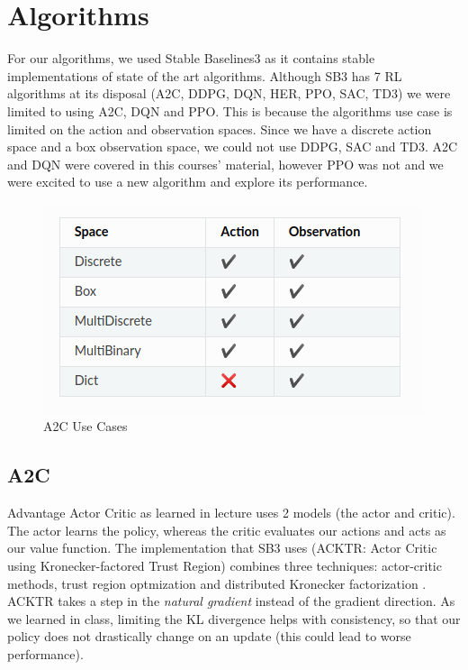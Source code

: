 \documentclass[twoside,11pt]{article}
\begin{document}
\section{Algorithms}
For our algorithms, we used Stable Baselines3 as it contains stable implementations of state of the art algorithms. Although SB3 has 7 RL algorithms at its disposal (A2C, DDPG, DQN, HER, PPO, SAC, TD3) we were limited to using A2C, DQN and PPO. This is because the algorithms use case is limited on the action and observation spaces. Since we have a discrete action space and a box observation space, we could not use DDPG, SAC and TD3. A2C and DQN were covered in this courses' material, however PPO was not and we were excited to use a new algorithm and explore its performance.

\begin{figure}[h]
       \includegraphics[scale=0.75]{a2c_use.png}   
       \centering    
       \caption{A2C Use Cases}
\end{figure}

\subsection{A2C}
Advantage Actor Critic as learned in lecture uses 2 models (the actor and critic). The actor learns the policy, whereas the critic evaluates our actions and acts as our value function. The implementation that SB3 uses (ACKTR: Actor Critic using Kronecker-factored Trust Region) combines three techniques: actor-critic methods, trust region optmization and distributed Kronecker factorization \cite{wu_2020}. ACKTR takes a step in the \textit{natural gradient} instead of the gradient direction. As we learned in class, limiting the KL divergence helps with consistency, so that our policy does not drastically change on an update (this could lead to worse performance). 
\end{document}
